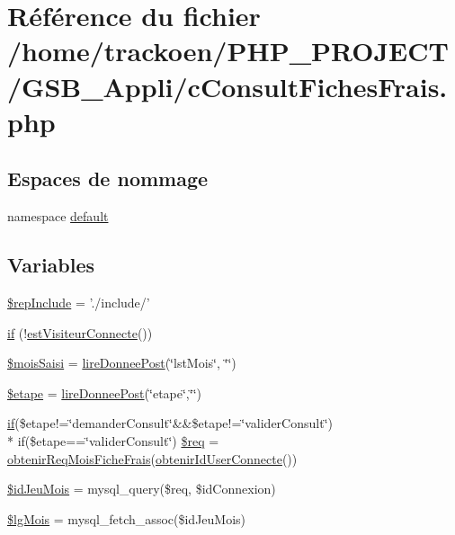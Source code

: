\hypertarget{c_consult_fiches_frais_8php}{\section{Référence du fichier /home/trackoen/\-P\-H\-P\-\_\-\-P\-R\-O\-J\-E\-C\-T/\-G\-S\-B\-\_\-\-Appli/c\-Consult\-Fiches\-Frais.php}
\label{c_consult_fiches_frais_8php}
}
\subsection*{Espaces de nommage}
\begin{DoxyCompactItemize}
\item 
namespace \hyperlink{namespacedefault}{default}
\end{DoxyCompactItemize}
\subsection*{Variables}
\begin{DoxyCompactItemize}
\item 
\hyperlink{c_consult_fiches_frais_8php_aad2a80747c2de66b59cb18d493ae7a8b}{\$rep\-Include} = './include/'
\item 
\hyperlink{c_consult_fiches_frais_8php_a12d9ecce0abd3757dd699cc19040e747}{if} (!\hyperlink{__gestion_session_8lib_8php_afe911e51f16958708b8b700981cd2567}{est\-Visiteur\-Connecte}())
\item 
\hyperlink{c_consult_fiches_frais_8php_aca0267343316d569312879584a4db9dd}{\$mois\-Saisi} = \hyperlink{__utilitaires_et_gestion_erreurs_8lib_8php_ab0070fc1ef4283caa3457dd5b71a86de}{lire\-Donnee\-Post}(\char`\"{}lst\-Mois\char`\"{}, \char`\"{}\char`\"{})
\item 
\hyperlink{c_consult_fiches_frais_8php_a5c1bc42ba293d577d9e25d76e50f85ec}{\$etape} = \hyperlink{__utilitaires_et_gestion_erreurs_8lib_8php_ab0070fc1ef4283caa3457dd5b71a86de}{lire\-Donnee\-Post}(\char`\"{}etape\char`\"{},\char`\"{}\char`\"{})
\item 
\hyperlink{c_se_connecter_8php_a161e098d41499c163a94c3fa5cd0e698}{if}(\$etape!=\char`\"{}demander\-Consult\char`\"{}\&\&\$etape!=\char`\"{}valider\-Consult\char`\"{}) \\*
if(\$etape==\char`\"{}valider\-Consult\char`\"{}) \hyperlink{c_consult_fiches_frais_8php_aa8307f98fa28d7f64c9762e7986440b6}{\$req} = \hyperlink{__bd_gestion_donnees_8lib_8php_af7ab441030c5c590de0b463414880a16}{obtenir\-Req\-Mois\-Fiche\-Frais}(\hyperlink{__gestion_session_8lib_8php_a7af627b049f30bda0af2678c3327aff0}{obtenir\-Id\-User\-Connecte}())
\item 
\hyperlink{c_consult_fiches_frais_8php_ae3f221921bd93ca690a99b756043483c}{\$id\-Jeu\-Mois} = mysql\-\_\-query(\$req, \$id\-Connexion)
\item 
\hyperlink{c_consult_fiches_frais_8php_ad97348117c6ea6767b8494f27a153a0f}{\$lg\-Mois} = mysql\-\_\-fetch\-\_\-assoc(\$id\-Jeu\-Mois)
\end{DoxyCompactItemize}


